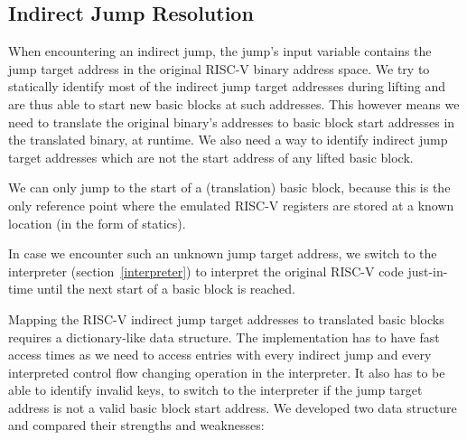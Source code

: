 \documentclass[course=eragp]{aspdoc}
\begin{document}
\subsection{Indirect Jump Resolution}\label{ijump_resolution}

When encountering an indirect jump, the jump's input variable contains the jump target address in the
original RISC-V binary address space. We try to statically identify most of the indirect jump target
addresses during lifting and are thus able to start new basic blocks at such addresses.
This however means we need to translate the original binary's addresses to basic block start
addresses in the translated binary, at runtime. We also need a way to identify
indirect jump target addresses which are not the start address of any lifted basic block.

We can only jump to the start of a (translation) basic block, because this is the only reference point where the
emulated RISC-V registers are stored at a known location (in the form of statics).

In case we encounter such an unknown jump target address, we switch to the interpreter (section~\ref{interpreter}) to
interpret the original RISC-V code just-in-time until the next start of a basic block is reached.

\par

Mapping the RISC-V indirect jump target addresses to translated basic blocks requires a
dictionary-like data structure.
The implementation has to have fast access times as we need to access entries with
every indirect jump and every interpreted control flow changing operation in the interpreter. It also has to be able
to identify invalid keys, to switch to the interpreter if the
jump target address is not a valid basic block start address. We developed two data structure and
compared their strengths and weaknesses:
\end{document}
